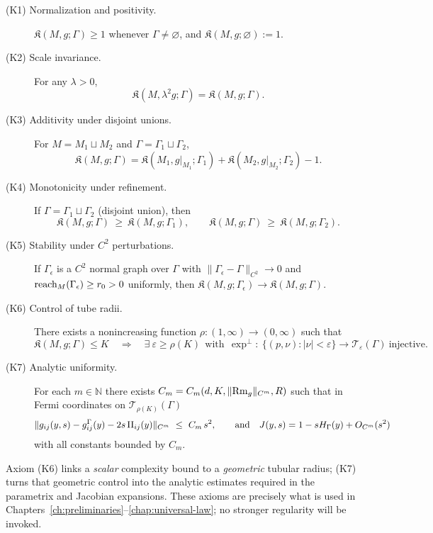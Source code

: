 \begin{description}
\item[(K1) Normalization and positivity.] $\mathfrak{K}(M,g;\Gamma)\ge 1$ whenever $\Gamma\neq\varnothing$, and $\mathfrak{K}(M,g;\varnothing):=1$.
\smallskip
\item[(K2) Scale invariance.] For any $\lambda>0$,
\[
\mathfrak{K}(M,\lambda^2 g;\Gamma)=\mathfrak{K}(M,g;\Gamma).
\]
\smallskip
\item[(K3) Additivity under disjoint unions.] For $M=M_1\sqcup M_2$ and $\Gamma=\Gamma_1\sqcup\Gamma_2$,
\[
\mathfrak{K}(M,g;\Gamma)=\mathfrak{K}(M_1,g|_{M_1};\Gamma_1)+\mathfrak{K}(M_2,g|_{M_2};\Gamma_2)-1.
\]
\smallskip
\item[(K4) Monotonicity under refinement.] If $\Gamma=\Gamma_1\sqcup\Gamma_2$ (disjoint union), then
\[
\mathfrak{K}(M,g;\Gamma)\ \ge\ \mathfrak{K}(M,g;\Gamma_1),\qquad
\mathfrak{K}(M,g;\Gamma)\ \ge\ \mathfrak{K}(M,g;\Gamma_2).
\]
\smallskip
\item[(K5) Stability under $C^2$ perturbations.] If $\Gamma_\epsilon$ is a $C^2$ normal graph over $\Gamma$ with $\|\Gamma_\epsilon-\Gamma\|_{C^2}\to 0$ and $\operatorname{reach}_M(\Gamma_\epsilon)\ge r_0>0$ uniformly, then $\mathfrak{K}(M,g;\Gamma_\epsilon)\to \mathfrak{K}(M,g;\Gamma)$.
\smallskip
\item[(K6) Control of tube radii.] There exists a nonincreasing function $\rho:(1,\infty)\to (0,\infty)$ such that
\[
\mathfrak{K}(M,g;\Gamma)\le K\quad\Longrightarrow\quad
\exists\ \varepsilon\ge \rho(K)\ \ \text{with}\ \ \exp^\perp:\ \{(p,\nu):|\nu|<\varepsilon\}\to \mathcal{T}_\varepsilon(\Gamma)\ \text{injective}.
\]
\smallskip
\item[(K7) Analytic uniformity.] For each $m\in\mathbb{N}$ there exists $C_m=C_m(d,K,\|{\rm Rm}_g\|_{C^m},R)$ such that in Fermi coordinates on $\mathcal{T}_{\rho(K)}(\Gamma)$
\[
\|g_{ij}(y,s)-g^\Gamma_{ij}(y)-2s\,\II_{ij}(y)\|_{C^m}\ \le\ C_m\, s^2,\qquad
\text{and}\quad
J(y,s)=1-sH_\Gamma(y)+O_{C^m}(s^2)
\]
with all constants bounded by $C_m$.
\end{description}

\begin{remark}[On (K6) and (K7)]
Axiom (K6) links a \emph{scalar} complexity bound to a \emph{geometric} tubular radius; (K7) turns that geometric control into the analytic estimates required in the parametrix and Jacobian expansions. These axioms are precisely what is used in Chapters~\ref{ch:preliminaries}–\ref{chap:universal-law}; no stronger regularity will be invoked.
\end{remark}

